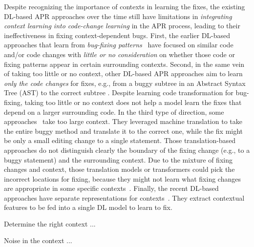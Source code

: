 Despite recognizing the importance of contexts in learning the fixes,
the existing DL-based APR approaches over the time still have
limitations in {\em integrating context learning into code-change
  learning} in the APR process, leading to their ineffectiveness in
fixing context-dependent bugs. First, the earlier DL-based approaches
that learn from {\em bug-fixing
  patterns}~\cite{white2016deep,gupta2017deepfix} have focused on
similar code and/or code changes with {\em little or no consideration}
on whether those code or fixing patterns appear in certain surrounding
contexts. Second, in the same vein of taking too little or no context,
other DL-based APR approaches aim to learn {\em only the code changes}
for fixes, e.g., from a buggy subtree in an Abstract Syntax Tree (AST)
to the correct subtree \cite{chakrabortycodit,see2017get}. Despite
learning code transformation for bug-fixing, taking too little or no
context does not help a model learn the fixes that depend on a larger
surrounding code. In the third type of direction, some
approaches~\cite{hata2018learning,tufano2019learning,tufano2018empirical}
take too large context. They leveraged machine translation to take the
entire buggy method and translate it to the correct one, while the fix
might be only a small editing change to a single statement. Those
translation-based approaches do not distinguish clearly the boundary
of the fixing change (e.g., to a buggy statement) and the surrounding
context. Due to the mixture of fixing changes and context, those
translation models or transformers could pick the incorrect locations
for fixing, because they might not learn what fixing changes are
appropriate in some specific contexts~\cite{icse20}. Finally, the
recent DL-based approaches have separate representations for
contexts~\cite{chen2018sequencer,cure-icse21,lutellier2020coconut}.
They extract contextual features to be fed into a single DL model to
learn to fix.

Determine the right context ...

Noise in the context ...


